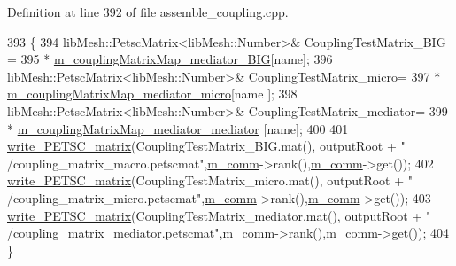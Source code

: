 Definition at line 392 of file assemble\+\_\+coupling.\+cpp.


\begin{DoxyCode}
393     \{
394         libMesh::PetscMatrix<libMesh::Number>& CouplingTestMatrix\_BIG =
395                                 * \hyperlink{classcarl_1_1assemble__coupling__matrices_af8127910d360a01b1b9c9878f03282f4}{m\_couplingMatrixMap\_mediator\_BIG}[name];
396         libMesh::PetscMatrix<libMesh::Number>& CouplingTestMatrix\_micro=
397                                 * \hyperlink{classcarl_1_1assemble__coupling__matrices_a73accf79c46d9ceab7f66f0e26c5e677}{m\_couplingMatrixMap\_mediator\_micro}[name
      ];
398         libMesh::PetscMatrix<libMesh::Number>& CouplingTestMatrix\_mediator=
399                                 * \hyperlink{classcarl_1_1assemble__coupling__matrices_a1a838735ff335cdf1d24403ceab3b896}{m\_couplingMatrixMap\_mediator\_mediator}
      [name];
400 
401         \hyperlink{namespacecarl_a431936850bf5712121d8399ddbd76aa8}{write\_PETSC\_matrix}(CouplingTestMatrix\_BIG.mat(), outputRoot + \textcolor{stringliteral}{"
      /coupling\_matrix\_macro.petscmat"},\hyperlink{classcarl_1_1assemble__coupling__matrices_a8a2164781f1a5f75ab1a5c7c4744f2f4}{m\_comm}->rank(),\hyperlink{classcarl_1_1assemble__coupling__matrices_a8a2164781f1a5f75ab1a5c7c4744f2f4}{m\_comm}->get());
402         \hyperlink{namespacecarl_a431936850bf5712121d8399ddbd76aa8}{write\_PETSC\_matrix}(CouplingTestMatrix\_micro.mat(), outputRoot + \textcolor{stringliteral}{"
      /coupling\_matrix\_micro.petscmat"},\hyperlink{classcarl_1_1assemble__coupling__matrices_a8a2164781f1a5f75ab1a5c7c4744f2f4}{m\_comm}->rank(),\hyperlink{classcarl_1_1assemble__coupling__matrices_a8a2164781f1a5f75ab1a5c7c4744f2f4}{m\_comm}->get());
403         \hyperlink{namespacecarl_a431936850bf5712121d8399ddbd76aa8}{write\_PETSC\_matrix}(CouplingTestMatrix\_mediator.mat(), outputRoot + \textcolor{stringliteral}{"
      /coupling\_matrix\_mediator.petscmat"},\hyperlink{classcarl_1_1assemble__coupling__matrices_a8a2164781f1a5f75ab1a5c7c4744f2f4}{m\_comm}->rank(),\hyperlink{classcarl_1_1assemble__coupling__matrices_a8a2164781f1a5f75ab1a5c7c4744f2f4}{m\_comm}->get());
404     \}
\end{DoxyCode}
\hypertarget{classcarl_1_1assemble__coupling__matrices_a4ae5318b482918a2894a7fbcfde71b47}{}
